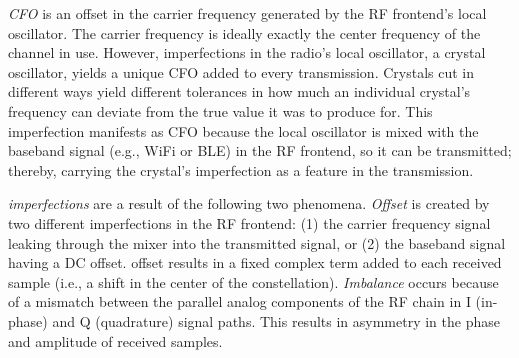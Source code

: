 
%

\vspace{0.5em} \noindent\emph{CFO} is an offset in the carrier frequency
generated by the RF frontend's local oscillator. The carrier frequency is
ideally exactly the center frequency of the channel in use. However,
imperfections in the radio's local oscillator, a crystal oscillator, yields a
unique CFO added to every transmission.  Crystals cut in different ways yield
different tolerances in how much an individual crystal's frequency can deviate
from the true value it was to produce for. This imperfection manifests as CFO
because the local oscillator is mixed with the baseband signal (e.g., WiFi or
BLE) in the RF frontend, so it can be transmitted; thereby, carrying the
crystal's imperfection as a feature in the transmission.

\vspace{0.5em} \noindent\emph{\iq imperfections} are a result of the following two
phenomena. \emph{\iq Offset} is created by two different imperfections in the RF frontend: (1) the
carrier frequency signal leaking through the mixer into the transmitted signal,
or (2) the baseband signal having a DC offset. \iq offset results in a fixed
complex term added to each received \iq sample (i.e., a shift in the center of
the constellation). \emph{\iq Imbalance} occurs because of a mismatch between
the parallel analog components of the RF chain in I (in-phase) and Q
(quadrature) signal paths. This results in asymmetry in the phase and amplitude
of received \iq samples.


